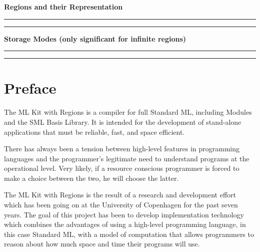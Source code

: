 \documentclass[12pt]{book}
\begin{document}
\begin{center}
\bf Regions and their Representation
\end{center}
\smallskip

\hrule
{}
\hrule
\medskip


\begin{center}
\bf Storage Modes (only significant for infinite regions)
\end{center}
\smallskip

\hrule
{}
\hrule
\medskip
               
\tableofcontents
\chapter*{Preface}
The ML Kit with Regions is a compiler for full
%
Standard ML, including Modules and the SML Basis Library.  It is
intended for the development of stand-alone applications that must be
reliable, fast, and space efficient.


There has always been a tension between high-level features in 
programming languages and the programmer's 
legitimate need to understand
programs at the operational level. Very likely, if a resource conscious
programmer is forced to make a choice between the two, he will choose the latter.

The ML Kit with Regions is the result of a research and development
effort which has been going on at the University of Copenhagen for the
past seven years. The goal of this project has been to develop
implementation technology which combines the advantages of using a
high-level programming language, in this case Standard ML, with a model of
computation that allows programmers to reason about how much space
and time their programs will use.
\end{document}
